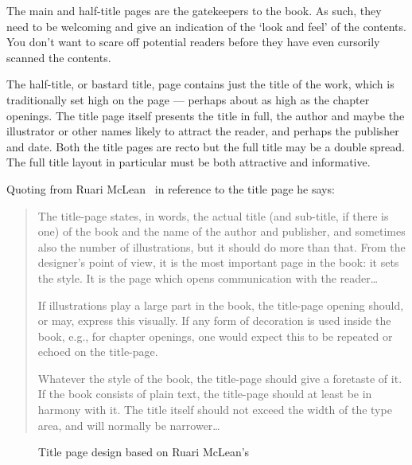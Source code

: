\documentclass[10pt,a4paper,extrafontsizes]{memoir}
\begin{document}
\begin{paracol}{2}
\switchEng
    The main and half-title pages are the gatekeepers to the book. As such,
they need to be welcoming and give an indication of the `look and feel'
of the contents. You don't want to scare off potential readers before they
have even cursorily scanned the contents.

    The half-title, or bastard 
title, page contains just the 
title of the
work, which is traditionally set high on the page --- perhaps about as high
as the chapter openings. The title page 
itself presents the title in full, 
the author and maybe the illustrator or
other names likely to attract the reader, and perhaps the publisher and date.
Both the title pages are recto but the full title may be a double spread.
The full title layout in particular must be both attractive and informative.

    Quoting from Ruari McLean~\autocite[p. 148]{MCLEAN80} in reference to the 
title page he says:
\begin{quotation}
    The title-page states, in words, the actual title (and sub-title, if 
there is one) of the book and the name of the author and publisher, and
sometimes also the number of illustrations, but it should do more than that.
From the designer's point of view, it is the most important page in the
book: it sets the style. It is the page which opens communication with the
reader\ldots

    If illustrations play a large part in the book, the title-page opening 
should, or may, express this visually. If any form of decoration is used 
inside the book, e.g., for chapter openings, one would expect this to be
repeated or echoed on the title-page.

    Whatever the style of the book, the title-page should give a foretaste
of it. If the book consists of plain text, the title-page should at least 
be in harmony with it. The title itself should not exceed the width of the
type area, and will normally be narrower\ldots
\end{quotation}
\end{paracol}

\begin{figure}
\centering
\begin{showtitle}
\titleJT
\end{showtitle}
\caption{Title page design based on Ruari McLean's } \label{fig:titleJT}
\end{figure}
\end{document}
